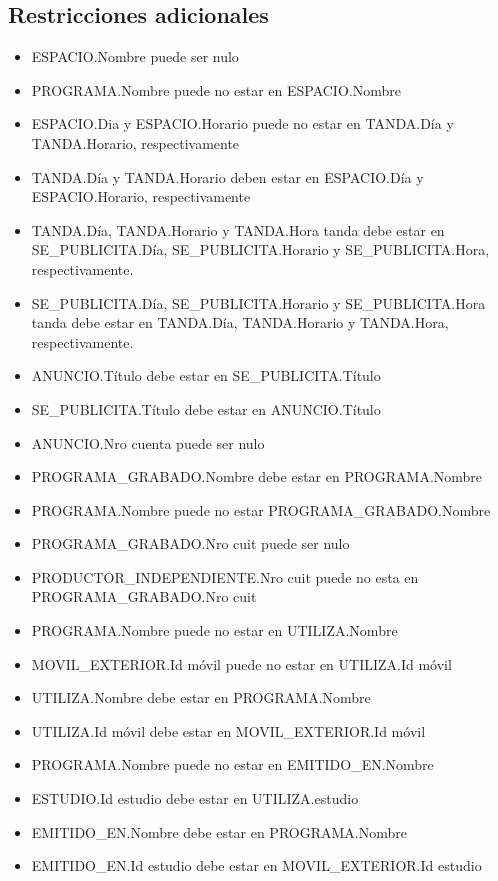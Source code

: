 \documentclass[a4paper,10pt]{article}
\begin{document}
  \subsection{Restricciones adicionales}
    \begin{itemize}
     \item ESPACIO.Nombre puede ser nulo
     \item PROGRAMA.Nombre puede no estar en ESPACIO.Nombre
     
     \item ESPACIO.Dia y ESPACIO.Horario puede no estar en TANDA.D\'ia y TANDA.Horario, respectivamente
     \item TANDA.D\'ia y TANDA.Horario deben estar en ESPACIO.D\'ia y ESPACIO.Horario, respectivamente
     
     \item TANDA.D\'ia, TANDA.Horario y TANDA.Hora tanda debe estar en \newline SE\_PUBLICITA.D\'ia, SE\_PUBLICITA.Horario 
      y SE\_PUBLICITA.Hora, respectivamente.
     \item SE\_PUBLICITA.D\'ia, SE\_PUBLICITA.Horario y SE\_PUBLICITA.Hora \newline tanda debe estar en TANDA.D\'ia, TANDA.Horario 
      y TANDA.Hora, respectivamente.
     \item ANUNCIO.T\'itulo debe estar en SE\_PUBLICITA.T\'itulo
     \item SE\_PUBLICITA.T\'itulo debe estar en ANUNCIO.T\'itulo
     
     \item ANUNCIO.Nro cuenta puede ser nulo

     \item PROGRAMA\_GRABADO.Nombre debe estar en PROGRAMA.Nombre
     \item PROGRAMA.Nombre puede no estar PROGRAMA\_GRABADO.Nombre

     \item PROGRAMA\_GRABADO.Nro cuit puede ser nulo
     \item PRODUCTOR\_INDEPENDIENTE.Nro cuit puede no esta en PROGRAMA\_GRABADO.Nro cuit

     \item PROGRAMA.Nombre puede no estar en UTILIZA.Nombre
     \item MOVIL\_EXTERIOR.Id m\'ovil puede no estar en UTILIZA.Id m\'ovil
     \item UTILIZA.Nombre debe estar en PROGRAMA.Nombre
     \item UTILIZA.Id m\'ovil debe estar en MOVIL\_EXTERIOR.Id m\'ovil

     \item PROGRAMA.Nombre puede no estar en EMITIDO\_EN.Nombre
     \item ESTUDIO.Id estudio debe estar en UTILIZA.estudio
     \item EMITIDO\_EN.Nombre debe estar en PROGRAMA.Nombre
     \item EMITIDO\_EN.Id estudio debe estar en MOVIL\_EXTERIOR.Id estudio
    \end{itemize}
\end{document}
